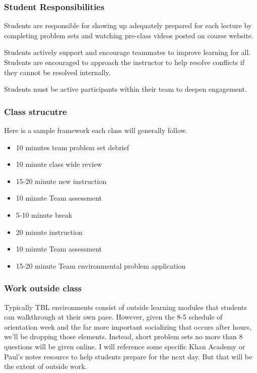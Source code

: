 \documentclass[
  letterpaper,
  DIV=11,
  numbers=noendperiod]{scrartcl}
\begin{document}
\subsubsection{Student Responsibilities}\label{student-responsibilities}

Students are responsible for showing up adequately prepared for each
lecture by completing problem sets and watching pre-class videos posted
on course website.

Students actively support and encourage teammates to improve learning
for all. Students are encouraged to approach the instructor to help
resolve conflicts if they cannot be resolved internally.

Students must be active participants within their team to deepen
engagement.

\subsubsection{Class strucutre}\label{class-strucutre}

Here is a sample framework each class will generally follow.

\begin{itemize}
\item
  10 minutes team problem set debrief
\item
  10 minute class wide review
\item
  15-20 minute new instruction
\item
  10 minute Team assessment
\item
  5-10 minute break
\item
  20 minute instruction
\item
  10 minute Team assessment
\item
  15-20 minute Team environmental problem application
\end{itemize}

\subsubsection{Work outside class}\label{work-outside-class}

Typically TBL environments consist of outside learning modules that
students can walkthrough at their own pace. However, given the 8-5
schedule of orientation week and the far more important socializing that
occurs after hours, we'll be dropping those elements. Instead, short
problem sets no more than 8 questions will be given online. I will
reference some specific Khan Academy or Paul's notes resource to help
students prepare for the next day. But that will be the extent of
outside work.
\end{document}
